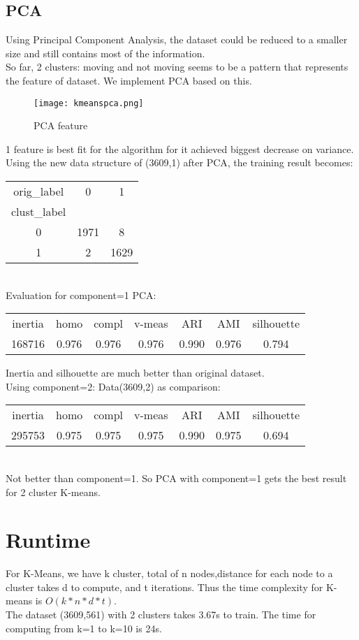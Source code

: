 \documentclass{article}
\begin{document}
\subsection{PCA}
Using Principal Component Analysis, the dataset could be reduced to a smaller size and still contains most of the information.\\
So far, 2 clusters: moving and not moving seems to be a pattern that represents the feature of dataset. We implement PCA based on this.\\

\begin{figure}[H]
\centering
\texttt{[image: kmeanspca.png]}
\caption{PCA feature}
\label{fig4.2}
\end{figure}
1 feature is best fit for the algorithm for it achieved biggest decrease on variance.\\
Using the new data structure of (3609,1) after PCA, the training result becomes:\\
\begin{tabular}{c|c|c}
orig\_label&0&1\\
clust\_label&&\\
0&1971&8\\
1&2&1629
\end{tabular}
\\
Evaluation for component=1 PCA:\\
\begin{tabular}{c|c|c|c|c|c|c}
inertia&homo&compl&v-meas&ARI&AMI&silhouette\\
168716&0.976&0.976&0.976&0.990&0.976&0.794
\end{tabular}
Inertia and silhouette are much better than original dataset.\\
Using component=2: Data(3609,2) as comparison:\\
\begin{tabular}{c|c|c|c|c|c|c}
inertia&homo&compl&v-meas&ARI&AMI&silhouette\\
295753&0.975&0.975&0.975&0.990&0.975&0.694
\end{tabular}\\
Not better than component=1. So PCA with component=1 gets the best result for 2 cluster K-means.

\section{Runtime}
For K-Means, we have k cluster, total of n nodes,distance for each node to a cluster takes d to compute, and t iterations. Thus the time complexity for K-means is $O(k*n*d*t)$.\\
The dataset (3609,561) with 2 clusters takes 3.67s to train. The time for computing from k=1 to k=10 is 24s.
\end{document}
